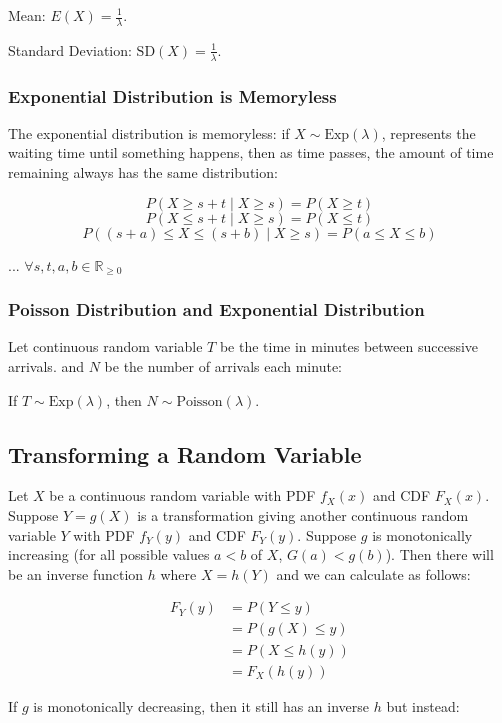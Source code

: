 Mean: $E(X) = \frac{1}{\lambda}$.

Standard Deviation: $\text{SD}(X) = \frac{1}{\lambda}$.

\subsubsection{Exponential Distribution is Memoryless}

The exponential distribution is memoryless: if $X \sim \text{Exp}(\lambda)$, represents the waiting time until something happens, then as time passes, the amount of time remaining always has the same distribution:

$$ P(X \geq s + t \mid X \geq s) = P(X \geq t) $$
$$ P(X \leq s + t \mid X \geq s) = P(X \leq t) $$
$$ P((s+a) \leq X \leq (s+b) \mid X \geq s) = P(a \leq X \leq b) $$

... $\forall s,t,a,b \in \mathbb{R}_{\geq 0}$

\subsubsection{Poisson Distribution and Exponential Distribution}

Let continuous random variable $T$ be the time in minutes between successive arrivals. and $N$ be the number of arrivals each minute:

If $T\sim \text{Exp}(\lambda)$, then $N \sim \text{Poisson}(\lambda)$.

\subsection{Transforming a Random Variable}

Let $X$ be a continuous random variable with PDF $f_X(x)$ and CDF $F_X(x)$.
Suppose $Y=g(X)$ is a transformation giving another continuous random variable $Y$ with PDF $f_Y(y)$ and CDF $F_Y(y)$.
Suppose $g$ is monotonically increasing (for all possible values $a<b$ of $X$, $G(a) < g(b)$).
Then there will be an inverse function $h$ where $X = h(Y)$ and we can calculate as follows:

\begin{align*}
    F_Y(y) & = P(Y \leq y)    \\
           & = P(g(X)\leq y)  \\
           & = P(X \leq h(y)) \\
           & = F_X(h(y))
\end{align*}

If $g$ is monotonically decreasing, then it still has an inverse $h$ but instead:

